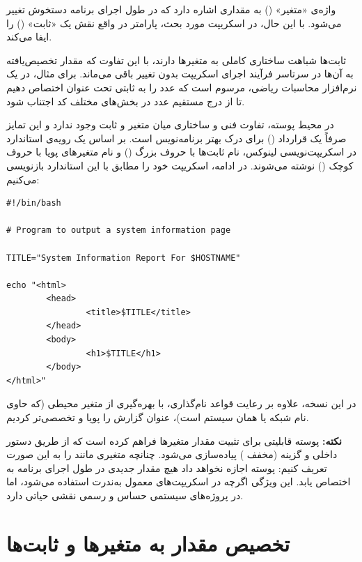 واژه‌ی «متغیر» () به مقداری اشاره دارد که در طول اجرای برنامه دستخوش تغییر می‌شود. با این حال، در اسکریپت مورد بحث، پارامتر  در واقع نقش یک «ثابت» () را ایفا می‌کند.

ثابت‌ها شباهت ساختاری کاملی به متغیرها دارند، با این تفاوت که مقدار تخصیص‌یافته به آن‌ها در سرتاسر فرآیند اجرای اسکریپت بدون تغییر باقی می‌ماند. برای مثال، در یک نرم‌افزار محاسبات ریاضی، مرسوم است که عدد  را به ثابتی تحت عنوان  اختصاص دهیم تا از درج مستقیم عدد در بخش‌های مختلف کد اجتناب شود.

در محیط پوسته، تفاوت فنی و ساختاری میان متغیر و ثابت وجود ندارد و این تمایز صرفاً یک قرارداد () برای درک بهتر برنامه‌نویس است. بر اساس یک رویه‌ی استاندارد در اسکریپت‌نویسی لینوکس، نام ثابت‌ها با حروف بزرگ () و نام متغیرهای پویا با حروف کوچک () نوشته می‌شوند. در ادامه، اسکریپت خود را مطابق با این استاندارد بازنویسی می‌کنیم:

\begin{latin}
\begin{lstlisting}
#!/bin/bash

# Program to output a system information page

TITLE="System Information Report For $HOSTNAME"

echo "<html>
        <head>
                <title>$TITLE</title>
        </head>
        <body>
                <h1>$TITLE</h1>
        </body>
</html>"
\end{lstlisting}
\end{latin}

در این نسخه، علاوه بر رعایت قواعد نام‌گذاری، با بهره‌گیری از متغیر محیطی  (که حاوی نام شبکه یا همان  سیستم است)، عنوان گزارش را پویا و تخصصی‌تر کردیم.

\begin{note}
\textbf{نکته:} پوسته قابلیتی برای تثبیت مقدار متغیرها فراهم کرده است که از طریق دستور داخلی  و گزینه  (مخفف ) پیاده‌سازی می‌شود. چنانچه متغیری مانند  را به این صورت تعریف کنیم:  پوسته اجازه نخواهد داد هیچ مقدار جدیدی در طول اجرای برنامه به  اختصاص یابد. این ویژگی اگرچه در اسکریپت‌های معمول به‌ندرت استفاده می‌شود، اما در پروژه‌های سیستمی حساس و رسمی نقشی حیاتی دارد.
\end{note}

\section{تخصیص مقدار به متغیرها و ثابت‌ها}

